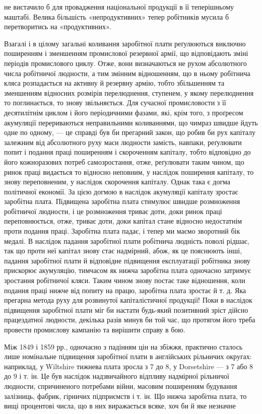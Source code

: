 \parcont{}  %
не вистачило б для провадження національної продукції в її
теперішньому маштабі. Велика більшість «непродуктивних»
тепер робітників мусила б перетворитись на «продуктивних».

Взагалі і в цілому загальні коливання заробітної плати реґулюються
виключно поширенням і зменшенням промислової резервної
армії, що відповідають зміні періодів промислового циклу.
Отже, вони визначаються не рухом абсолютного числа робітничої
людности, а тим змінним відношенням, що в ньому робітнича кляса
розпадається на активну й резервну армію, тобто збільшенням
та зменшенням відносних розмірів перелюднення, ступенем, у
якому перелюднення то поглинається, то знову звільняється.
Для сучасної промисловости з її десятилітнім циклом і його періодичними
фазами, які, крім того, з проґресом акумуляції перериваються
неправильними коливаннями, що чимраз швидше йдуть
одне по одному, — це справді був би прегарний закон, що робив
би рух капіталу залежним від абсолютного руху маси людности
замість, навпаки, реґулювати попит і подання праці поширенням
і скороченням капіталу, тобто відповідно до його кожноразових
потреб самозростання, отже, реґулювати таким чином,
що ринок праці видається то відносно неповним, у наслідок
поширення капіталу, то знову переповненим, у наслідок скорочення
капіталу. Однак така є догма політичної економії. За цією
догмою в наслідок акумуляції капіталу зростає заробітна плата.
Підвищена заробітна плата стимулює швидше розмноження робітничої
людности, і це розмноження триває доти, доки ринок
праці переповнюється, отже, триває доти, доки капітал стане
відносно недостатнім проти подання праці. Заробітна плата падає,
і тепер ми маємо зворотний бік медалі. В наслідок падання
заробітної плати робітнича людність поволі рідшає, так що проти
неї капітал знову стає надмірний, абож, як це пояснюють інші,
падання заробітної плати й відповідне підвищення експлуатації
робітника знову прискорює акумуляцію, тимчасом як нижча
заробітна плата одночасно затримує зростання робітничої кляси.
Таким чином знову постає таке відношення, коли подання праці
нижче від попиту на працю, заробітна плата зростає й т. д.
Яка прегарна метода руху для розвинутої капіталістичної продукції!
Поки в наслідок підвищення заробітної плати міг би
настати будь-який позитивний зріст дійсно працездатної людности,
декілька разів минув би той час, що протягом його треба
провести промислову кампанію та вирішити справу в бою.

Між 1849 і 1859 рр., одночасно з падінням цін на збіжжя,
практично сталось лише номінальне підвищення заробітної
плати в англійських рільничих округах: наприклад, у Wiltshire
тижнева плата зросла з 7 до 8, у Dorsetshire — з 7 або
8 до 9 і т. ін. Це був наслідок надзвичайного
відпливу надмірної рільничої людности, спричиненого потребами
війни, масовим поширенням будування залізниць, фабрик, гірничих
підприємств і т. ін. Що нижча заробітна плата, то вищі процентові
числа, що в них виражається всяке, хоч би й яке незначне
\parbreak{}  %
